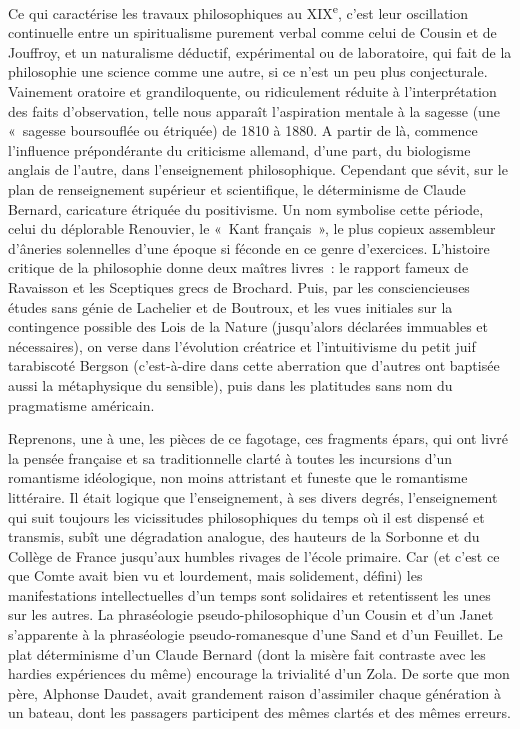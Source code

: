 \documentclass[french,twoside]{book} %
\begin{document}
Ce qui caractérise les travaux philosophiques au XIX\textsuperscript{e}, c’est leur oscillation continuelle entre un spiritualisme purement verbal comme celui de Cousin et de Jouffroy, et un naturalisme déductif, expérimental ou de laboratoire, qui fait de la philosophie une science comme une autre, si ce n’est un peu plus conjecturale. Vainement oratoire et grandiloquente, ou ridiculement réduite à l’interprétation des faits d’observation, telle nous apparaît l’aspiration mentale à la sagesse (une « sagesse boursouflée ou étriquée) de 1810 à 1880. A partir de là, commence l’influence prépondérante du criticisme allemand, d’une part, du biologisme anglais de l’autre, dans l’enseignement philosophique. Cependant que sévit, sur le plan de renseignement supérieur et scientifique, le déterminisme de Claude Bernard, caricature étriquée du positivisme. Un nom symbolise cette période, celui du déplorable Renouvier, le « Kant français », le plus copieux assembleur d’âneries solennelles d’une époque si féconde en ce genre d’exercices. L’histoire critique de la philosophie donne deux maîtres livres : le rapport fameux de Ravaisson et les Sceptiques grecs de Brochard. Puis, par les consciencieuses études sans génie de Lachelier et de Boutroux, et les vues initiales sur la contingence possible des Lois de la Nature (jusqu’alors déclarées immuables et nécessaires), on verse dans l’évolution créatrice et l’intuitivisme du petit juif tarabiscoté Bergson (c’est-à-dire dans cette aberration que d’autres ont baptisée aussi la métaphysique du sensible), puis dans les platitudes sans nom du pragmatisme américain.\par
Reprenons, une à une, les pièces de ce fagotage, ces fragments épars, qui ont livré la pensée française et sa traditionnelle clarté à toutes les incursions d’un romantisme idéologique, non moins attristant et funeste que le romantisme littéraire. Il était logique que l’enseignement, à ses divers degrés, l’enseignement qui suit toujours les vicissitudes philosophiques du temps où il est dispensé et transmis, subît une dégradation analogue, des hauteurs de la Sorbonne et du Collège de France jusqu’aux humbles rivages de l’école primaire. Car (et c’est ce que Comte avait bien vu et lourdement, mais solidement, défini) les manifestations intellectuelles d’un temps sont solidaires et retentissent les unes sur les autres. La phraséologie pseudo-philosophique d’un Cousin et d’un Janet s’apparente à la phraséologie pseudo-romanesque d’une Sand et d’un Feuillet. Le plat déterminisme d’un Claude Bernard (dont la misère fait contraste avec les hardies expériences du même) encourage la trivialité d’un Zola. De sorte que mon père, Alphonse Daudet, avait grandement raison d’assimiler chaque génération à un bateau, dont les passagers participent des mêmes clartés et des mêmes erreurs.\par
\end{document}
